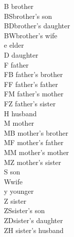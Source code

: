\begin{refsection}
{\begin{tabbing}
B\> brother\\
BS\>brother's son\\
BD\>brother's daughter\\
BW\>brother's wife\\
e\> elder\\
D\> daughter\\
F \> father\\
FB \> father's brother\\
FF \> father's father\\
FM \> father's mother\\
FZ \> father's sister\\
H\> husband\\
M \> mother\\
MB \> mother's brother\\
MF \> mother's father\\
MM \> mother's mother\\
MZ \> mother's sister\\
S \> son\\
W\>wife\\
y \> younger\\
Z \> sister\\
ZS\>sister's son\\
ZD\>sister's daughter\\
ZH\> sister's husband\\

\end{tabbing}
}

\printbibliography[heading=subbibliography]
\end{refsection}

